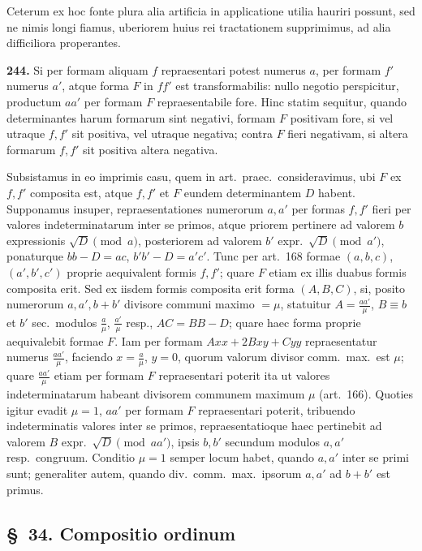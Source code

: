 \documentclass[12pt,a4paper]{article}
\theoremstyle{plain}
\theoremstyle{definition}
\theoremstyle{remark}
\theoremstyle{problemstyle}
\begin{document}
Ceterum ex hoc fonte plura alia artificia in applicatione utilia hauriri possunt, sed ne nimis longi fiamus, uberiorem huius rei tractationem supprimimus, ad alia difficiliora properantes.


\textbf{244.} Si per formam aliquam $f$ repraesentari potest numerus $a$, per formam $f'$ numerus $a'$, atque forma $F$ in $ff'$ est transformabilis: nullo negotio perspicitur, productum $aa'$ per formam $F$ repraesentabile fore. Hinc statim sequitur, quando determinantes harum formarum sint negativi, formam $F$ positivam fore, si vel utraque $f, f'$ sit positiva, vel utraque negativa; contra $F$ fieri negativam, si altera formarum $f, f'$ sit positiva altera negativa.

Subsistamus in eo imprimis casu, quem in art.\ praec.\ consideravimus, ubi $F$ ex $f, f'$ composita est, atque $f, f'$ et $F$ eundem determinantem $D$ habent. Supponamus insuper, repraesentationes numerorum $a, a'$ per formas $f, f'$ fieri per valores indeterminatarum inter se primos, atque priorem pertinere ad valorem $b$ expressionis $\sqrt{D} \pmod{a}$, posteriorem ad valorem $b'$ expr.\ $\sqrt{D} \pmod{a'}$, ponaturque $bb - D = ac$, $b'b' - D = a'c'$. Tunc per art.\ 168 formae $(a, b, c)$, $(a', b', c')$ proprie aequivalent formis $f, f'$; quare $F$ etiam ex illis duabus formis composita erit. Sed ex iisdem formis composita erit forma $(A, B, C)$, si, posito numerorum $a, a', b + b'$ divisore communi maximo $= \mu$, statuitur $A = \frac{aa'}{\mu}$, $B \equiv b$ et $b'$ sec.\ modulos $\frac{a}{\mu}$, $\frac{a'}{\mu}$ resp., $AC = BB - D$; quare haec forma proprie aequivalebit formae $F$. Iam per formam $Axx + 2Bxy + Cyy$ repraesentatur numerus $\frac{aa'}{\mu}$, faciendo $x = \tfrac{a}{\mu}$, $y = 0$, quorum valorum divisor comm.\ max.\ est $\mu$; quare $\frac{aa'}{\mu}$ etiam per formam $F$ repraesentari poterit ita ut valores indeterminatarum habeant divisorem communem maximum $\mu$ (art.\ 166). Quoties igitur evadit $\mu = 1$, $aa'$ per formam $F$ repraesentari poterit, tribuendo indeterminatis valores inter se primos, repraesentatioque haec pertinebit ad valorem $B$ expr.\ $\sqrt{D} \pmod{aa'}$, ipsis $b, b'$ secundum modulos $a, a'$ resp.\ congruum. Conditio $\mu = 1$ semper locum habet, quando $a, a'$ inter se primi sunt; generaliter autem, quando div.\ comm.\ max.\ ipsorum $a, a'$ ad $b + b'$ est primus.


\subsection*{\S\ 34. Compositio ordinum}
\end{document}
